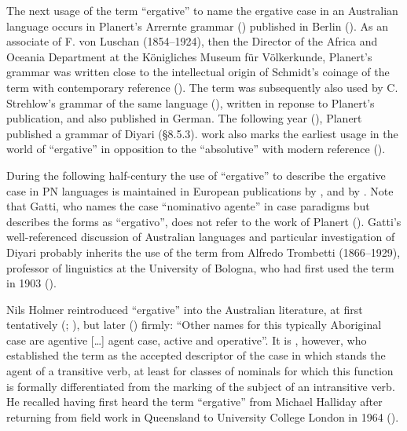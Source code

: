 The next usage of the term “ergative” to name the ergative case in an Australian language occurs in Planert’s Arrernte grammar (\citeyear{planert_australische_1907}) published in Berlin ().  As an associate of F. von Luschan (1854--1924), then the Director of the Africa and Oceania Department at the Königliches Museum für Völkerkunde, Planert’s grammar was written close to the intellectual origin of Schmidt’s coinage of the term with contemporary reference (\citealt{schmidt_sprachlichen_1902}). The term was subsequently also used by C. Strehlow’s grammar of the same language (\citeyear{strehlow_einige_1908}), written in reponse to Planert’s publication, and also published in German. The following year (\citeyear{planert_australische_1908}), Planert published a grammar of Diyari (§8.5.3).  work also marks the earliest usage in the world of “ergative” in opposition to the “absolutive” with modern reference ().

During the following half-century the use of “ergative” to describe the ergative case in PN languages is maintained in European publications by \citet{schmidt_personalpronomina_1919}, \citet{gatti_lingua_1930} and by \citet{holmer_history_1963}. Note that Gatti, who names the case “nominativo agente” in case paradigms but describes the forms as ``ergativo'', does not refer to the work of Planert (\citeyear{planert_australische_1908}). Gatti’s well-referenced discussion of Australian languages and particular investigation of Diyari probably inherits the use of the term from Alfredo Trombetti (1866–1929), professor of linguistics at the University of Bologna, who had first used the term in 1903 (\citealt[211]{manaster-ramer_origin_1994}). 

Nils Holmer reintroduced “ergative” into the Australian literature, at first tentatively (\citeyear{holmer_history_1963}; \citeyear{holmer_attempt_1966}), but later (\citeyear[7]{holmer_notes_1971}) firmly: “Other names for this typically Aboriginal case are agentive […] agent case, active and operative”. It is \citet[59--60]{dixon_dyirbal_1972}, however, who established the term as the accepted descriptor of the case in which stands the agent of a transitive verb, at least for classes of nominals for which this function is formally differentiated from the marking of the subject of an intransitive verb. He recalled having first heard the term “ergative” from Michael Halliday after returning from field work in Queensland to University College London in 1964 (\citealt[127]{dixon_searching_1983}).

